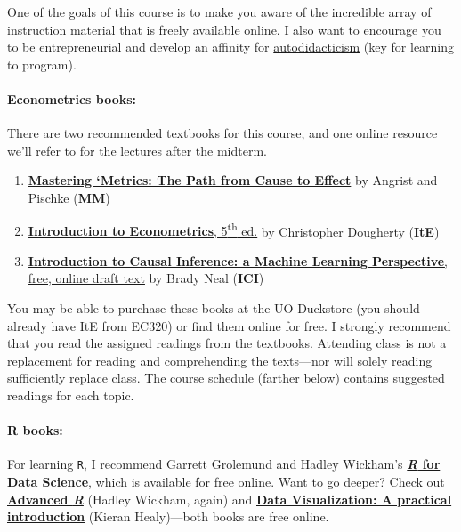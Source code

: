 \documentclass[10pt]{article}
\begin{document}
One of the goals of this course is to make you aware of the incredible array of instruction material that is freely available online. I also want to encourage you to be entrepreneurial and develop an affinity for \href{https://en.wikipedia.org/wiki/Autodidacticism}{autodidacticism} (key for learning to program).

\paragraph{Econometrics books:} There are two recommended textbooks for this course, and one online resource we'll refer to for the lectures after the midterm.

\begin{enumerate}
  \item \href{https://www.amazon.com/Mastering-Metrics-Path-Cause-Effect/dp/0691152845/}{\textbf{Mastering `Metrics: The Path from Cause to Effect}} by Angrist and Pischke (\textbf{MM})
  \item \href{http://smile.amazon.com/Introduction-Econometrics-Christopher-Dougherty/dp/0199676828/}{\textbf{Introduction to Econometrics}, 5\textsuperscript{th} ed.} by Christopher Dougherty (\textbf{ItE})
  \item \href{https://www.bradyneal.com/causal-inference-course\#course-textbook}{\textbf{Introduction to Causal Inference: a Machine Learning Perspective}, free, online draft text} by Brady Neal (\textbf{ICI})\end{enumerate}
You may be able to purchase these books at the UO Duckstore (you should already have ItE from EC320) or find them online for free. I strongly recommend that you read the assigned readings from the textbooks. Attending class is not a replacement for reading and comprehending the texts---nor will solely reading sufficiently replace class. The course schedule (farther below) contains suggested readings for each topic.

\paragraph{R books:} For learning \texttt{R}, I recommend Garrett Grolemund and Hadley Wickham's \href{http://r4ds.had.co.nz}{\textbf{\textit{R} for Data Science}}, which is available for free online. Want to go deeper? Check out \href{http://adv-r.had.co.nz/}{\textbf{Advanced \textit{R}}} (Hadley Wickham, again) and \href{http://socviz.co/}{\textbf{Data Visualization: A practical introduction}} (Kieran Healy)---both books are free online.
\end{document}

